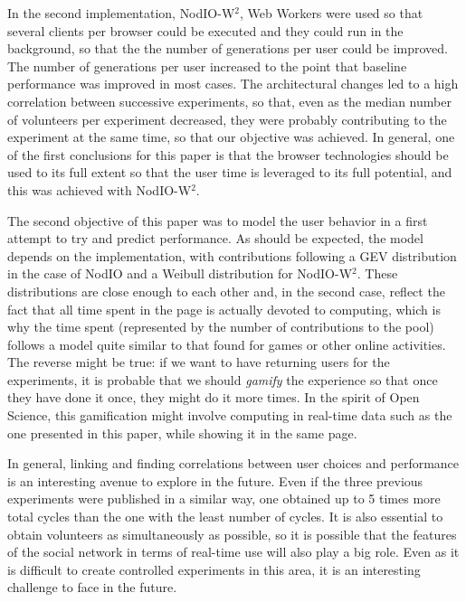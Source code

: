 \documentclass[journal,onecolumn]{IEEEtran}
\begin{document}
In the second implementation, {\sf NodIO-W$^2$}, Web Workers
were used so that several clients per browser could be executed and
they could run in the background, so that the the number of
generations per user could be improved. The number of generations per
user increased to the point that baseline performance was improved in
most cases. The architectural changes led to a high correlation
between successive experiments, so that, even as the median number of
volunteers per experiment decreased, they were probably contributing
to the experiment at the same time, so that our objective was
achieved. In general, one of the first conclusions for this paper is
that the browser technologies should be used to its full extent so
that the user time is leveraged to its full potential, and this was
achieved with {\sf NodIO-W$^2$}. 

The second objective of this paper was to model the user behavior in a
first attempt to try and predict performance. As should be expected,
the model depends on the implementation, with contributions following
a GEV distribution in the case of {\sf NodIO} and a
Weibull distribution for {\sf NodIO-W$^2$}. These distributions are
close enough to each other and, in the second case, reflect the fact
that all time spent in the page is actually devoted to computing,
which is why the time spent (represented by the number of
contributions to the pool) follows a model quite similar to that found
for games or other online activities. The reverse might be true: if we
want to have returning users for the experiments, it is probable that
we should {\em gamify} the experience so that once they have done it
once, they might do it more times. In the spirit of Open Science, this
gamification might involve computing in real-time data such as the one
presented in this paper, while showing it in the same page. 

In general, linking and finding correlations between user choices and
performance is an interesting avenue to explore in the future. Even if
the three previous experiments were published in a similar way, one
obtained up to 5 times more total cycles  than the one with the least
number of cycles. It is also essential to obtain volunteers as
simultaneously as possible, so it is possible that the features of the
social network in terms of real-time use will also play a big
role. Even as it is difficult to create controlled experiments in this
area, it is an interesting challenge to face in the future. %
\end{document}
